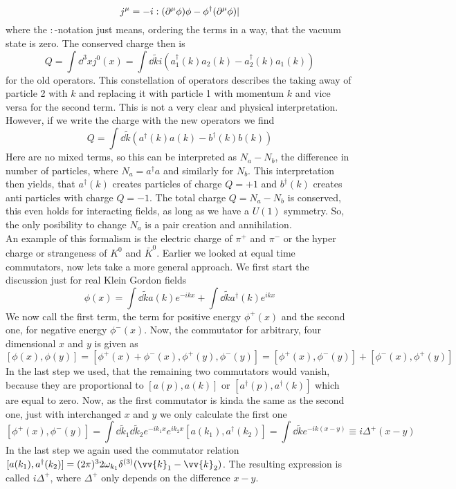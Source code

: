 \[ j^\mu = -i:(\partial^\mu \phi)\phi - \phi^\dagger(\partial^\mu \phi)|\]
where the $:$-notation just means, ordering the terms in a way, that the vacuum state is zero. The conserved charge then is
\[ Q = \int \dd ^3 x j^0(x) = \int \dd \tilde{k} i \left( a_1^\dagger(k) a_2(k) - a_2^\dagger(k) a_1(k) \right)\]
for the old operators. This constellation of operators describes the taking away of particle 2 with $k$ and replacing it with particle 1 with momentum $k$ and vice versa for the second term. This is not a very clear and physical interpretation. However, if we write the charge with the new operators we find
\[  Q = \int \dd \tilde{k} \left( a^\dagger(k) a(k) - b^\dagger(k)b(k)\right)\]
Here are no mixed terms, so this can be interpreted as $N_a- N_b$, the difference in number of particles, where $N_a = a^\dagger a$ and similarly for $N_b$. This interpretation then yields, that $a^\dagger(k)$ creates particles of charge $Q = +1$ and $b^\dagger(k)$ creates anti particles with charge $Q = -1$. The total charge $Q = N_a - N_b$ is conserved, this even holds for interacting fields, as long as we have a $U(1)$ symmetry. So, the only posibility to change $N_a$ is a pair creation and annihilation.\\
An example of this formalism is the electric charge of $\pi^+$ and $\pi^-$ or the hyper charge or strangeness of $K^0$ and $\bar{K}^0$.
Earlier we looked at equal time commutators, now lets take a more general approach. We first start the discussion just for real Klein Gordon fields
\[ \phi(x) = \int \dd \tilde{k} a(k) e^{-ikx} + \int \dd \tilde{k} a^\dagger(k) e^{ikx}\]
We now call the first term, the term for positive energy $\phi^+(x)$ and the second one, for negative energy $\phi^-(x)$. Now, the commutator for arbitrary, four dimensional $x$ and $y$ is given as
\[ [ \phi(x), \phi(y)] = [\phi^+(x) + \phi^-(x), \phi^+(y), \phi^-(y)]=[\phi^+(x), \phi^-(y)] + [ \phi^-(x), \phi^+(y)]\]
In the last step we used, that the remaining two commutators would vanish, because they are proportional to $[a(p),a(k)]$ or $[a^\dagger(p), a^\dagger(k)]$ which are equal to zero.  Now, as the first commutator is kinda the same as the second one, just with interchanged $x$ and $y$ we only calculate the first one
\[ [\phi^+(x), \phi^-(y)] = \int \dd \tilde{k}_1 \dd \tilde{k}_2 e^{-ik_1x} e^{ik_2x} [a(k_1), a^\dagger(k_2)] = \int \dd \tilde{k} e^{-ik(x-y)} \equiv i \Delta^+(x-y)\]
In the last step we again used the commutator relation $[ a(k_1), a^\dagger(k_2)] = (2\pi)^3 2 \omega_{k_1} \delta^{(3)} (\vv{k}_1 - \vv{k}_2)$. The resulting expression is called $i \Delta^+$, where $\Delta^+$ only depends on the difference $x-y$.\\
